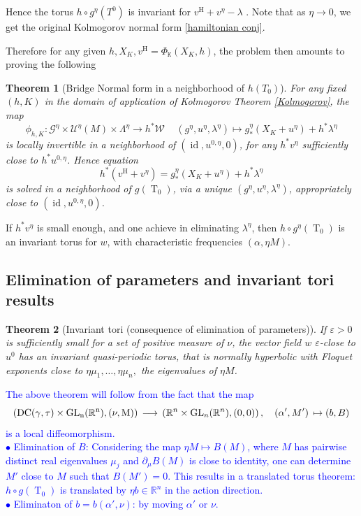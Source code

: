 \documentclass[oneside, 11pt]{amsbook}
\def\a{\alpha}
\newcommand{\R}{\mathbb{R}}
\newcommand{\eps}{\varepsilon}
\newcommand{\GL}{\operatorname{GL}}
\newcommand{\vh}{v^{\text{H}}} %
\newcommand{\id}{\operatorname{id}}
\newcommand{\cG}{{\mathcal G}}
\newcommand{\cU}{{\mathcal U}}
\newcommand{\cW}{{\mathcal W}}
\newcommand{\tK}{{\mathtt{K}}}
\newcommand{\0}{{(0)}}
\newcommand{\3}{{(3)}}
\newcommand{\blue}[1]{\textcolor{blue}{#1}}
\newtheorem{thm}{Theorem}[section]
\numberwithin{equation}{section}
\numberwithin{defn}{section}
\numberwithin{prop}{section}
\numberwithin{cor}{section}
\numberwithin{lemma}{section}
\numberwithin{rmk}{section}
\numberwithin{corollary}{section}
\newcommand{\To}{\operatorname{T}_0}
\begin{document}
\medskip


Hence the torus $h\circ g^\eta (T^0)$ is invariant for $\vh + v^\eta - \lambda$ . Note that as $\eta\to 0$, we get the original Kolmogorov normal form \eqref{hamiltonian conj}. 

\medskip

Therefore for any given $h, X_K, \vh = \Phi_{\tK}(X_K, h)$, the problem then amounts to proving the following 

\begin{thm}[Bridge Normal form in a neighborhood of $h(T_0)$]\label{bridge thm}
    For any fixed $(h,K)$ in the domain of application of Kolmogorov Theorem \ref{Kolmogorov}, 
    the map
    \begin{equation}
\label{phi intermedio} 
\phi_{h,K}:   \cG^\eta\times\cU^\eta(M)  \times \Lambda^\eta \to h^{*}\cW\, \quad  ( g^\eta, u^\eta, \lambda^\eta)\mapsto  g^\eta_*(X_K + u^\eta) + h^*\lambda^\eta
\end{equation}
is locally invertible in a neighborhood of $(\id, u^{0,\eta},0)$, for any $h^* v^\eta$ sufficiently close to $h^*u^{0,\eta}$. Hence equation $$h^*(\vh + v^\eta) = g^\eta_*(X_K + u^\eta) + h^*\lambda^\eta$$ is solved in a neighborhood of $g(\To)$, via a unique $(g^\eta, u^{\eta}, \lambda^\eta)$, appropriately close to $(\id, u^{0,\eta}, 0)$.
\end{thm}

If $h^*v^\eta$ is small enough, and one achieve in eliminating $\lambda^\eta$, then $h\circ g^\eta(\To)$ is an invariant torus for $w$, with characteristic frequencies $(\alpha, \eta M)$.

\subsection{Elimination of parameters and invariant tori results}



\begin{thm}[Invariant tori (consequence of elimination of parameters)]\label{th.NF3} If $\eps>0$ is sufficiently small for a set of positive measure of $\nu$,  the vector field
$w$ $\eps$-close to $u^0$ has an invariant quasi-periodic torus, that is normally hyperbolic with Floquet exponents close to $\eta \mu_1,\ldots,\eta \mu_n,$ the eigenvalues of $\eta M$.
\end{thm}

\blue{
The above theorem will follow from the fact that the map 
$$ \left(\rm{DC}(\gamma,\tau)\times \GL_n(\R^n), ( \nu, M)\right) \, \longrightarrow \, \left(\R^n\times \GL_n(\R^n), (0,0)\right) 
, \quad (\a',M') \, \mapsto (b, B)
$$
is a local diffeomorphism.\\
$\bullet$ Elimination of $B$: Considering the map $\eta M\mapsto B(M)$, where $M$ has pairwise distinct real eigenvalues $\mu_{j}$ and $\partial_{\mu}B(M)$ is close to identity, one can determine $M'$ close to $M$ such that $B(M') =0$. This results in a translated torus theorem: $h\circ g(\To)$ is translated by $\eta b\in\R^{n}$ in the action direction. \\
$\bullet$ Eliminaton of $b = b(\alpha', \nu)$: by moving $\alpha'$ or $\nu$.}
\end{document}
